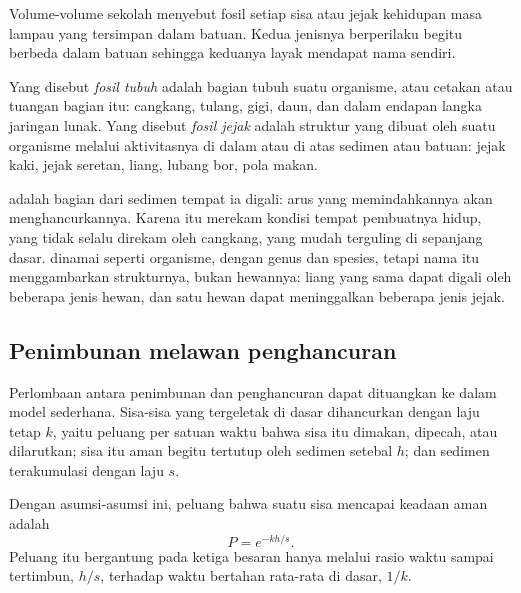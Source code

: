 Volume-volume sekolah menyebut fosil setiap sisa atau jejak kehidupan masa lampau yang tersimpan dalam batuan. Kedua jenisnya
berperilaku begitu berbeda dalam batuan sehingga keduanya layak mendapat nama sendiri.

\begin{definition}\label{def:b2:palaeoenvironments:fossil-kinds}
Yang disebut \emph{fosil tubuh} adalah bagian tubuh suatu organisme, atau cetakan atau tuangan
bagian itu: cangkang, tulang, gigi, daun, dan dalam endapan langka jaringan lunak. Yang disebut
\emph{fosil jejak} adalah struktur yang dibuat oleh suatu organisme melalui aktivitasnya di dalam atau
di atas sedimen atau batuan: jejak kaki, jejak seretan, liang, lubang bor, pola makan.
\end{definition}

 adalah bagian dari sedimen tempat ia digali: arus yang memindahkannya akan menghancurkannya.
Karena itu  merekam kondisi tempat pembuatnya hidup, yang tidak selalu direkam oleh cangkang,
yang mudah terguling di sepanjang dasar.  dinamai seperti organisme, dengan
genus dan spesies, tetapi nama itu menggambarkan strukturnya, bukan hewannya: liang yang sama dapat
digali oleh beberapa jenis hewan, dan satu hewan dapat meninggalkan beberapa jenis jejak.

\subsection*{Penimbunan melawan penghancuran}

Perlombaan antara penimbunan dan penghancuran dapat dituangkan ke dalam model sederhana. Sisa-sisa yang tergeletak di
dasar dihancurkan dengan laju tetap $k$, yaitu peluang per satuan waktu bahwa sisa itu dimakan,
dipecah, atau dilarutkan; sisa itu aman begitu tertutup oleh sedimen setebal $h$; dan
sedimen terakumulasi dengan laju $s$.

\begin{proposition}\label{prop:b2:palaeoenvironments:burial}
Dengan asumsi-asumsi ini, peluang bahwa suatu sisa mencapai keadaan aman adalah
\[
  P = e^{-kh/s}.
\]
Peluang itu bergantung pada ketiga besaran hanya melalui rasio waktu sampai tertimbun, $h/s$, terhadap
waktu bertahan rata-rata di dasar, $1/k$.
\end{proposition}

